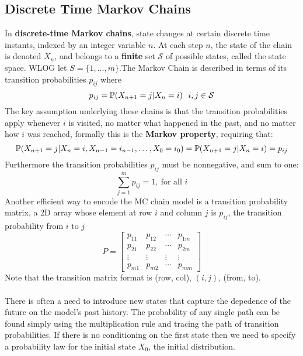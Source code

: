 \documentclass[11pt]{scrartcl}
\begin{document}
\subsection{Discrete Time Markov Chains}
In \textbf{discrete-time Markov chains}, state changes at certain discrete time
instants, indexed by an integer variable $n$. At each step $n$, the state of
the chain is denoted $X_{n}$, and belongs to a \textbf{finite} set $\mathcal{S}$ of
possible states, called the state space. WLOG let $S = \{1,\ldots,m\}$.The Markov Chain is described in terms
of its transition probabilities $p_{ij}$ where \[
  p_{ij} = \mathbb{P}(X_{n+1} = j | X_{n}=i) ~~ i,j \in \mathcal{S}
\] 
The key assumption underlying these chains is that the transition probabilities
apply whenever $i$ is visited, no matter what happened in the past, and no
matter how $i$ was reached, formally this is the \textbf{Markov property},
requiring that: \[
  \mathbb{P}(X_{n+1} = j | X_{n}=i, X_{n-1}=i_{n-1},\ldots,X_0=i_0) = \mathbb{P}(X_{n+1}=j
  | X_{n}=i) = p_{ij}
\] Furthermore the transition probabilities $p_{ij}$ must be nonnegative, and
sum to one: \[
  \sum_{j=1}^{m}  p_{ij} = 1, ~\text{for all }i
\] 
Another efficient way to encode the MC chain model is a transition probability
matrix, a 2D array whose element at row $i$ and column $j$ is $p_{ij}$, the
transition probability from $i$ to $j$ \[
P = \begin{bmatrix}
  p_{11} & p_{12} & \cdots & p_{1m} \\
  p_{21} & p_{22} & \cdots & p_{2m} \\
  \vdots & \vdots & \vdots & \vdots \\
  p_{m 1} & p_{m 2} & \cdots & p_{mm}
\end{bmatrix}
\] Note that the transition matrix format is (row, col), $(i,j)$, (from,
to).\\\\There is often a need to introduce new states that capture the depedence of the
future on the model's past history. The probability of any single path can be
found simply using the multiplication rule and tracing the path of transition
probabilities. If there is no conditioning on the first state then we need to
specify a probability law for the initial state $X_0$, the initial
distribution.
\end{document}
